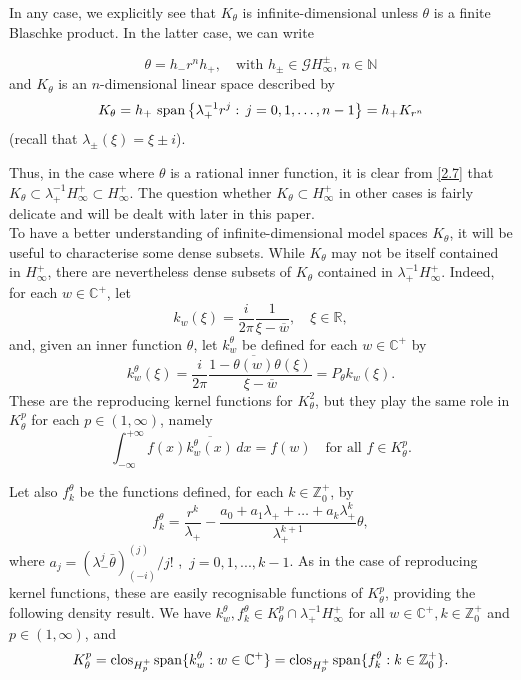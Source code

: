 \documentclass[11pt]{article}
\def\CC{\mathbb{C}}
\def\RR{\mathbb{R}}
\renewcommand\span{\mathop{\rm span}\nolimits}
\def\spam{\span} %
\def\clos{{\rm clos}}
\def\ds{\displaystyle}
\numberwithin{equation}{section}
\def\beq{\begin{equation}}
\def\eeq{\end{equation}}
\begin{document}
In any case, we explicitly see that $K_\theta$ is infinite-dimensional unless $\theta$ is a finite Blaschke product. In the latter case, we can write

\beq \label{2.6}
\theta =h_-r^nh_+, \quad \text{with } h_\pm \in \mathcal{G}H_{\infty}^{\pm}, \, n \in \mathbb N
\eeq
and $K_\theta$ is an $n$-dimensional linear space described by
\beq \label{2.7}
K_\theta = h_+\, \spam \left\{\lambda_+^{-1}r^j:\, j=0,1,\hdots, n-1\right\}=h_+K_{r^n}
\eeq
(recall that $\lambda_\pm(\xi)=\xi \pm i$).

Thus, in the case where $\theta$ is a rational inner function, it is clear from \eqref{2.7} that $K_\theta\subset \lambda_+^{-1}H_{\infty}^+\subset H_{\infty}^+$. 
The question whether $K_\theta\subset H_{\infty}^+$ in other cases is fairly delicate and will be dealt with later in this paper.\\

To have a better understanding of infinite-dimensional model spaces $K_\theta$, it will be useful to characterise some dense subsets. 
While $K_\theta$ may not be itself contained in $H_\infty^+$, there are nevertheless dense subsets of $K_\theta$ contained in $\lambda_+^{-1}H_{\infty}^+$. Indeed, for each $w \in \CC^+$, let
\beq \label{2.8}
k_w(\xi)=\frac{i}{2\pi}\frac{1}{\xi-\overline{w}}, \quad \xi \in \RR,
\eeq
and, given an inner function $\theta$, let $k_w^\theta$ be defined for each $w \in \CC^+$ by
\beq \label{2.9}
k_w^\theta(\xi)=\frac{i}{2\pi}\frac{1-\overline{\theta(w)}\theta(\xi)}{\xi-\overline{w}}=P_\theta k_w(\xi).
\eeq
These are the reproducing kernel functions for $K_{\theta}^2$, but they play the same role in $K_{\theta}^p$ for each $p\in (1,\infty)$, namely
\beq \label{2.10}
\ds \int_{-\infty}^{+\infty} f(x)\overline{k_w^\theta(x)}\,dx=f(w)\quad \text{for all } f \in K_{\theta}^p.
\eeq

Let also $f_k^\theta$ be the functions defined, for each $k\in\mathbb{Z}_0^+$, by
\[
f_k^\theta=\frac{r^k}{\lambda_+}-\frac{a_0+a_1\lambda_+ +\hdots +a_k \lambda_+^k}{\lambda_+^{k+1}}\theta,
\]
where $a_j=(\lambda_-^j \bar \theta)^{(j)}_{(-i)}/j!$ , \,$j=0,1,...,k-1$. As in the case of reproducing kernel functions, these are easily recognisable functions of $K_\theta^p$, providing the following density result.
We have $k^\theta_w, f_k^\theta \in K_{\theta}^p \cap \lambda_+^{-1}H^+_\infty$ for all $w \in \CC^+, k\in\mathbb{Z}_0^+$ and $p \in (1,\infty)$, and
\[
K_{\theta}^p = \clos_{H^+_p} \spam \{ k^\theta_w: w \in \CC^+ \}=\clos_{H^+_p} \spam \{ f_k^\theta: k \in \mathbb{Z}_0^+ \}.
\]
\end{document}
